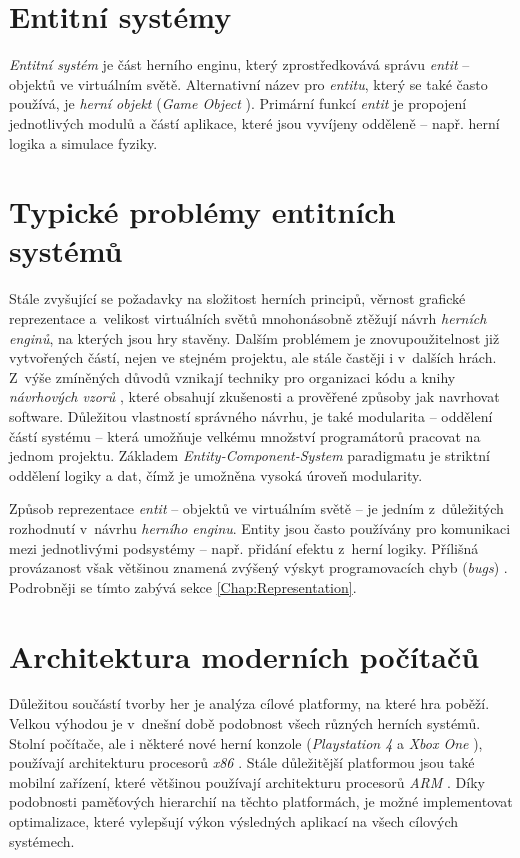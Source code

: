 \section{Entitní systémy}

\emph{Entitní systém} je část herního enginu, který zprostředkovává správu \emph{entit} -- objektů ve virtuálním světě. Alternativní název pro \emph{entitu}, který se také často používá, je \emph{herní objekt} (\emph{Game Object} \cite{UnityGo}). Primární funkcí \emph{entit} je propojení jednotlivých modulů a částí aplikace, které jsou vyvíjeny odděleně -- např. herní logika a simulace fyziky.

\section{Typické problémy entitních systémů}

Stále zvyšující se požadavky na složitost herních principů, věrnost grafické reprezentace a~velikost virtuálních světů mnohonásobně ztěžují návrh \emph{herních enginů}, na kterých jsou hry stavěny. Dalším problémem je znovupoužitelnost již vytvořených částí, nejen ve stejném projektu, ale stále častěji i v~dalších hrách. Z~výše zmíněných důvodů vznikají techniky pro organizaci kódu a knihy \emph{návrhových vzorů} \cite{DesignPatterns, GameDesignPatterns}, které obsahují zkušenosti a prověřené způsoby jak navrhovat software. Důležitou vlastností správného návrhu, je také modularita -- oddělení částí systému -- která umožňuje velkému množství programátorů pracovat na jednom projektu. Základem \emph{Entity-Component-System} paradigmatu je striktní oddělení logiky a dat, čímž je umožněna vysoká úroveň modularity. 

Způsob reprezentace \emph{entit} -- objektů ve virtuálním světě -- je jedním z~důležitých rozhodnutí v~návrhu \emph{herního enginu}. Entity jsou často používány pro komunikaci mezi jednotlivými podsystémy -- např. přidání efektu z~herní logiky. Přílišná provázanost však většinou znamená zvýšený výskyt programovacích chyb (\emph{bugs}) \cite{GameDesignPatterns}. Podrobněji se tímto zabývá sekce \ref{Chap:Representation}.

\section{Architektura moderních počítačů}

Důležitou součástí tvorby her je analýza cílové platformy, na které hra poběží. Velkou výhodou je v~dnešní době podobnost všech různých herních systémů. Stolní počítače, ale i některé nové herní konzole (\emph{Playstation 4} a \emph{Xbox One} \cite{Ps4Xbox}), používají architekturu procesorů \emph{x86} \cite{IntelX86-64, AmdX86-64}. Stále důležitější platformou jsou také mobilní zařízení, které většinou používají architekturu procesorů \emph{ARM} \cite{ARM}. Díky podobnosti paměťových hierarchií na těchto platformách, je možné implementovat optimalizace, které vylepšují výkon výsledných aplikací na všech cílových systémech.

